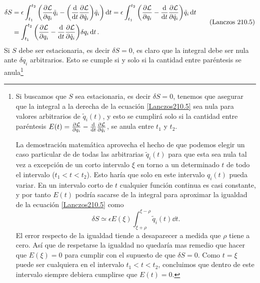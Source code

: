 \documentclass[12pt, spanish, a4paper, ]{article}
\begin{document}
\begin{equation}\label{Lanczos210.5}
	\begin{aligned}
    \delta S &= 
    \epsilon \int_{t_1}^{t_2 } \pqty{\pdv{\mathcal{L}}{q_i} \tilde{q}_i - \pqty{ \dv{t} \pdv{\mathcal{L}}{\dot{q}_i} } \tilde{q}_i } \dd{t} = 
    \epsilon \int_{t_1}^{t_2 } \pqty{\pdv{\mathcal{L}}{q_i} - \dv{t} \pdv{\mathcal{L}}{\dot{q}_i} } \tilde{q}_i \dd{t} \\
		&= \int_{t_1}^{t_2 } \pqty{\pdv{\mathcal{L}}{q_i} - \dv{t} \pdv{\mathcal{L}}{\dot{q}_i} } \delta q_i \dd{t}.
	\end{aligned}
	\tag{Lanczos 210.5}
\end{equation}
Si \(S\) debe ser estacionaria, es decir \(\delta S=0\), es claro que la integral debe ser nula ante \(\delta q_i\) arbitrarios.
Esto se cumple si y solo si la cantidad entre paréntesis se anula\footnote{
Si buscamos que \(S\) sea estacionaria, es decir \(\delta S=0\), tenemos que asegurar que la integral a la derecha de la ecuación \eqref{Lanczos210.5} sea nula para valores arbitrarios de \(\tilde{q}_i (t)\), y esto se cumplirá solo si la cantidad entre paréntesis \(E(t)= \pdv{\mathcal{L}}{q_i} - \dv{t} \pdv{\mathcal{L}}{\dot{q}_i}\), se anula entre \(t_1\) y \(t_2\).

La demostración matemática aprovecha el hecho de que podemos elegir un caso particular de de todas las arbitrarias \(\tilde{q}_i (t)\) para que esta sea nula tal vez a excepción de un corto intervalo \(\xi\) en torno a un determinado \(t\) de todo el intervalo (\(t_1 < t < t_2\)).
Esto haría que solo en este intervalo \(q_i(t)\) pueda variar.
En un intervalo corto de \(t\) cualquier función continua es casi constante, y por tanto \(E(t)\) podría sacarse de la integral para aproximar la igualdad de la ecuación \eqref{Lanczos210.5} como
\begin{equation}\label{Lanczos210.8}
    \delta S \simeq \epsilon E(\xi) \int_{\xi+ \rho}^{\xi - \rho} \tilde{q}_i (t) \dd{t}.
    \tag{Lanczos 210.8}
\end{equation}
El error respecto de la igualdad tiende a desaparecer a medida que \(\rho\) tiene a cero.
Así que de respetarse la igualdad no quedaría mas remedio que hacer que \(E(\xi)=0\) para cumplir con el supuesto de que \(\delta S=0\).
Como \(t=\xi\) puede ser cualquiera en el intervalo \(t_1<t<t_2\), concluimos que dentro de este intervalo siempre debiera cumplirse que \(E(t)=0\).

}
\end{document}
